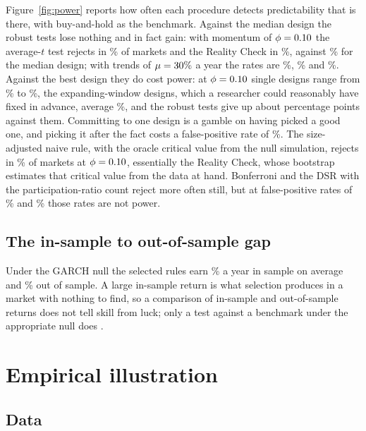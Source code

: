 \documentclass[pdflatex,sn-basic]{sn-jnl}
\theoremstyle{thmstyleone}
\theoremstyle{thmstylethree}
\begin{document}
Figure~\ref{fig:power} reports how often each procedure detects predictability that is there, with
buy-and-hold as the benchmark. Against the median design the robust tests lose nothing and in fact
gain: with momentum of $\phi=0.10$ the average-$t$ test rejects in \NumPowerAvg\% of markets and
the Reality Check in \NumPowerMax\%, against \NumPowerMedian\% for the median design; with trends of
$\mu=30\%$ a year the rates are \NumPowerAvgMu\%, \NumPowerMaxMu\% and \NumPowerMedianMu\%.
Against the best design they do cost power: at $\phi=0.10$ single designs range from
\NumPowerSingleMin\% to \NumPowerSingleMax\%, the expanding-window designs, which a researcher could
reasonably have fixed in advance, average \NumPowerExpanding\%, and the robust tests give up about
\NumPowerGapPoints{} percentage points against them. Committing to one design is a gamble on having
picked a good one, and picking it after the fact costs a false-positive rate of \NumSizeBestNaive\%. The
size-adjusted naive rule, with the oracle critical value from the null simulation, rejects in
\NumPowerNaiveAdj\% of markets at $\phi=0.10$, essentially the Reality Check, whose bootstrap
estimates that critical value from the data at hand. Bonferroni and the DSR with the
participation-ratio count reject more often still, but at false-positive rates of \NumSizeBonfEff\% and
\NumSizeDSREff\% those rates are not power.

\subsection{The in-sample to out-of-sample gap}

Under the GARCH null the selected rules earn \NumISann\% a year in sample on average and \NumOOSann\%
out of sample. A large in-sample return is what selection produces in a market with nothing to find,
so a comparison of in-sample and out-of-sample returns does not tell skill from luck; only a test
against a benchmark under the appropriate null does \citep{inoue2005,harvey2015}.

\section{Empirical illustration}\label{sec:empirical}

\subsection{Data}
\end{document}
